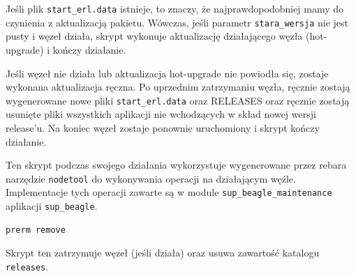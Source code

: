 \documentclass[polish,12pt]{aghthesis}
\begin{document}
Jeśli plik \texttt{start\_erl.data} istnieje, to znaczy, że najprawdopodobniej mamy do czynienia z aktualizacją pakietu. Wówczas, jeśli parametr \texttt{stara\_wersja} nie jest pusty i węzeł działa, skrypt wykonuje aktualizację działającego węzła (hot-upgrade) i kończy działanie.

Jeśli węzeł nie działa lub aktualizacja hot-upgrade nie powiodła się, zostaje wykonana aktualizacja ręczna. Po uprzednim zatrzymaniu węzła, ręcznie zostają wygenerowane nowe pliki \texttt{start\_erl.data} oraz RELEASES oraz ręcznie zostają usunięte pliki wszystkich aplikacji nie wchodzących w skład nowej wersji release'u. Na koniec węzeł zostaje ponownie uruchomiony i skrypt kończy działanie.

Ten skrypt podczas swojego działania wykorzystuje wygenerowane przez rebara narzędzie \texttt{nodetool} do wykonywania operacji na działającym węźle. Implementacje tych operacji zawarte są w module \texttt{sup\_beagle\_maintenance} aplikacji \texttt{sup\_beagle}.

\begin{verbatim}
prerm remove
\end{verbatim}

Skrypt ten zatrzymuje węzeł (jeśli działa) oraz usuwa zawartość katalogu \texttt{releases}.
\end{document}
